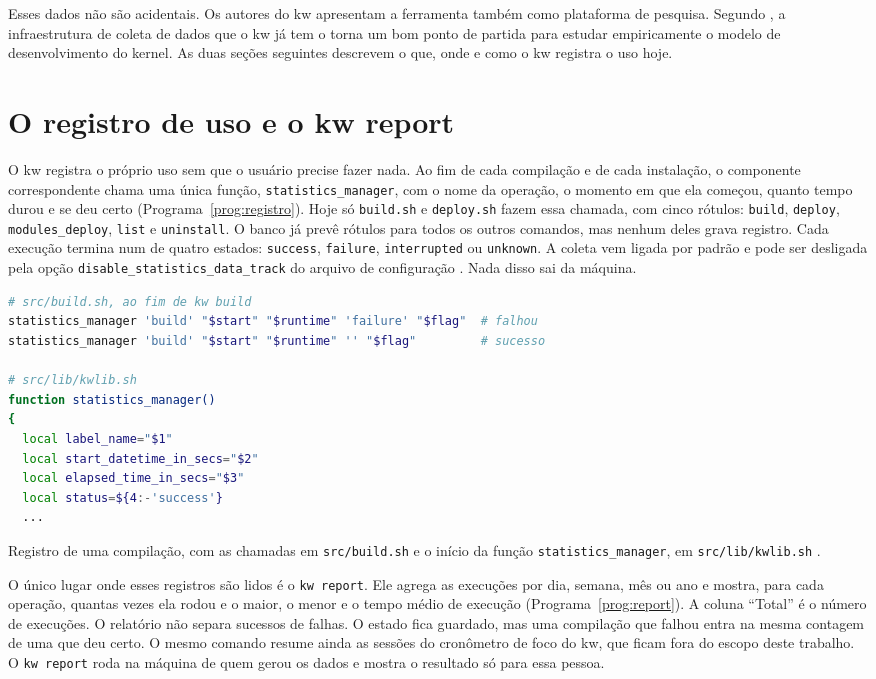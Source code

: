 Esses dados não são acidentais. Os autores do kw apresentam a ferramenta
também como plataforma de pesquisa. Segundo \citet{tadokoro2025kw}, a
infraestrutura de coleta de dados que o kw já tem o torna um bom ponto de
partida para estudar empiricamente o modelo de desenvolvimento do kernel. As
duas seções seguintes descrevem o que, onde e como o kw registra o uso hoje.

\section{O registro de uso e o kw report}
\label{sec:funcionalidades}

O kw registra o próprio uso sem que o usuário precise fazer nada. Ao fim de
cada compilação e de cada instalação, o componente correspondente chama uma
única função, \texttt{statistics\_manager}, com o nome da operação, o momento
em que ela começou, quanto tempo durou e se deu certo
(Programa~\ref{prog:registro}). Hoje só \texttt{build.sh} e
\texttt{deploy.sh} fazem essa chamada, com cinco rótulos: \texttt{build},
\texttt{deploy}, \texttt{modules\_deploy}, \texttt{list} e
\texttt{uninstall}. O banco já prevê rótulos para todos os outros comandos,
mas nenhum deles grava registro. Cada execução termina num de quatro
estados: \texttt{success}, \texttt{failure}, \texttt{interrupted} ou
\texttt{unknown}. A coleta vem ligada por padrão e pode ser desligada pela
opção \texttt{disable\_statistics\_data\_track} do arquivo de configuração
\citep{kworkflowrepo, tadokoro2025kw}. Nada disso sai da máquina.

\begin{program}[htbp]
  \centering
\begin{lstlisting}[language=bash, style=wider]
# src/build.sh, ao fim de kw build
statistics_manager 'build' "$start" "$runtime" 'failure' "$flag"  # falhou
statistics_manager 'build' "$start" "$runtime" '' "$flag"         # sucesso

# src/lib/kwlib.sh
function statistics_manager()
{
  local label_name="$1"
  local start_datetime_in_secs="$2"
  local elapsed_time_in_secs="$3"
  local status=${4:-'success'}
  ...
\end{lstlisting}
  \caption{Registro de uma compilação, com as chamadas em \texttt{src/build.sh}
    e o início da função \texttt{statistics\_manager}, em
    \texttt{src/lib/kwlib.sh} \citep{kworkflowrepo}.}
  \label{prog:registro}
\end{program}

O único lugar onde esses registros são lidos é o \texttt{kw report}. Ele
agrega as execuções por dia, semana, mês ou ano e mostra, para cada
operação, quantas vezes ela rodou e o maior, o menor e o tempo médio de
execução (Programa~\ref{prog:report}). A coluna \enquote{Total} é o número de
execuções. O relatório não separa sucessos de
falhas. O estado fica guardado, mas uma compilação que falhou entra na mesma
contagem de uma que deu certo. O mesmo comando resume ainda as sessões do
cronômetro de foco do kw, que ficam fora do escopo deste trabalho. O
\texttt{kw report} roda na máquina de quem gerou os dados e mostra o
resultado só para essa pessoa.

